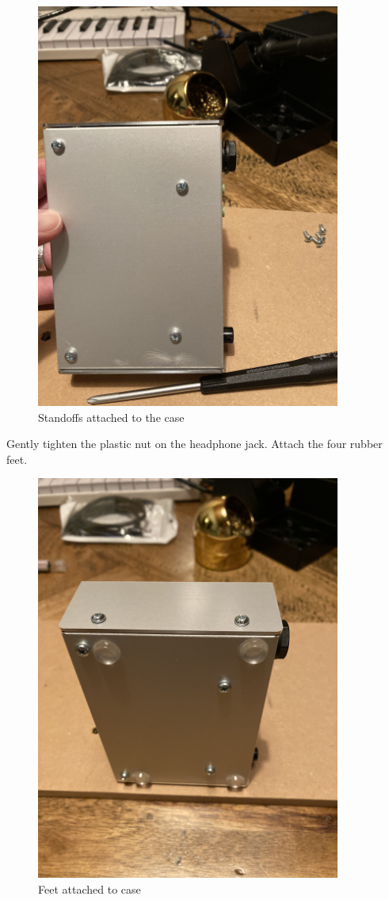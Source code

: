 \documentclass{scrartcl}
\begin{document}
\begin{figure}[!htbp]
    \begin{center}
        \includegraphics[width=100mm]{assets/case-underside.jpg}
        \caption{Standoffs attached to the case}
    \end{center}
\end{figure}


Gently tighten the plastic nut on the headphone jack. Attach the four rubber feet.

\begin{figure}[!htbp]
    \begin{center}
        \includegraphics[width=100mm]{assets/case-underside-finished.jpg}
        \caption{Feet attached to case}
    \end{center}
\end{figure}
\end{document}
